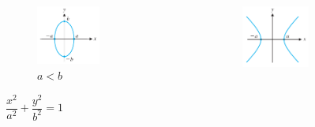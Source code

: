 \begin{frame}[c]
\begin{columns}[c]
\begin{column}{0.45\textwidth}
\begin{figure}
\begin{subfigure}[b]{0.4\textwidth}
					\includegraphics[width=1.4\textwidth]{imagenes/elipse2}
					\caption{$a<b$}
				\end{subfigure}
				\vspace{3mm}
				\caption{$\dfrac{x^2}{a^2}+\dfrac{y^2}{b^2}=1$}
			\end{figure}
		\end{column}
		\hspace{6mm}
		\begin{column}{0.45\textwidth}
			\begin{figure}
				\centering
				\begin{subfigure}[b]{0.4\textwidth}
					\includegraphics[width=1.4\textwidth]{imagenes/hiperbola1}					

\end{subfigure}
\end{figure}
\end{column}
\end{columns}
\end{frame}
